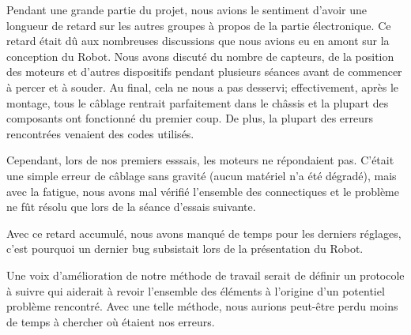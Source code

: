\documentclass[a4paper,11pt]{article}
\begin{document}
Pendant une grande partie du projet, nous avions le sentiment d'avoir une longueur de retard sur les autres groupes à propos de la partie électronique. 
Ce retard était dû aux nombreuses discussions que nous avions eu en amont sur la conception du Robot.
Nous avons discuté du nombre de capteurs, de la position des moteurs et d'autres dispositifs pendant plusieurs séances avant de commencer à percer et à souder.
Au final, cela ne nous a pas desservi; effectivement, après le montage, tous le câblage rentrait parfaitement dans le châssis et la plupart des composants ont fonctionné du premier coup.
De plus, la plupart des erreurs rencontrées venaient des codes utilisés.

Cependant, lors de nos premiers esssais, les moteurs ne répondaient pas. C'était une simple erreur de câblage sans gravité (aucun matériel n'a été dégradé), 
mais avec la fatigue, nous avons mal vérifié l'ensemble des connectiques et le problème ne fût résolu que lors de la séance d'essais suivante.

Avec ce retard accumulé, nous avons manqué de temps pour les derniers réglages, c'est pourquoi un dernier bug subsistait lors de la présentation du Robot.

Une voix d'amélioration de notre méthode de travail serait de définir un protocole à suivre qui aiderait à revoir l'ensemble des éléments à l'origine d'un potentiel problème rencontré.
Avec une telle méthode, nous aurions peut-être perdu moins de temps à chercher où étaient nos erreurs.

\subsection{}
\end{document}
